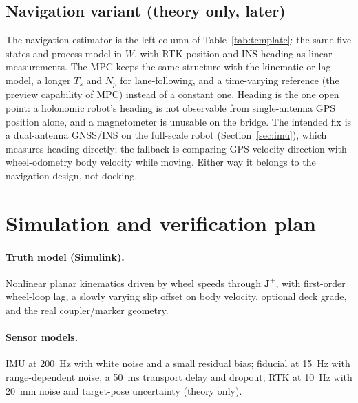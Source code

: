 \documentclass[11pt,a4paper]{article}
\newcommand{\mat}[1]{\bm{#1}}
\newcommand{\Ts}{T_s}
\newcommand{\Np}{N_p}
\begin{document}
\subsection{Navigation variant (theory only, later)}
The navigation estimator is the left column of Table~\ref{tab:template}: the same five states and process model in $W$, with RTK position and INS heading as linear measurements. The MPC keeps the same structure with the kinematic or lag model, a longer $\Ts$ and $\Np$ for lane-following, and a time-varying reference (the preview capability of MPC) instead of a constant one. Heading is the one open point: a holonomic robot's heading is not observable from single-antenna GPS position alone, and a magnetometer is unusable on the bridge. The intended fix is a dual-antenna GNSS/INS on the full-scale robot (Section~\ref{sec:imu}), which measures heading directly; the fallback is comparing GPS velocity direction with wheel-odometry body velocity while moving. Either way it belongs to the navigation design, not docking.

\section{Simulation and verification plan}
\label{sec:verif}

\paragraph{Truth model (Simulink).} Nonlinear planar kinematics driven by wheel speeds through $\mat J^{+}$, with first-order wheel-loop lag, a slowly varying slip offset on body velocity, optional deck grade, and the real coupler/marker geometry.

\paragraph{Sensor models.} IMU at 200~Hz with white noise and a small residual bias; fiducial at 15~Hz with range-dependent noise, a 50~ms transport delay and dropout; RTK at 10~Hz with 20~mm noise and target-pose uncertainty (theory only).
\end{document}
